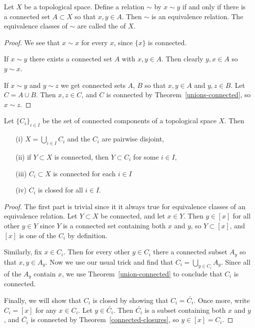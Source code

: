 \begin{prop}
  Let $X$ be a topological space. Define a relation $\sim$ by $x \sim y$ if and only if there is a connected set $A \subset X$ so that $x,y \in A$. Then $\sim$ is an equivalence relation. The equivalence classes of $\sim$ are called the  of $X$.
\end{prop}
\begin{proof}
  We see that $x \sim x$ for every $x$, since $\{x\}$ is connected.
  
  If $x \sim y$ there exists a connected set $A$ with $x,y \in A$. Then clearly $y,x \in A$ so $y \sim x$.
  
  If $x \sim y$ and $y \sim z$ we get connected sets $A$, $B$ so that $x,y \in A$ and $y,z \in B$. Let $C = A \cup B$. Then $x,z \in C$, and $C$ is connected by Theorem~\ref{unions-connected}, so $x \sim z$.
\end{proof}
\begin{prop}
  \label{props-of-conn-components}
  Let $\{C_i\}_{i \in I}$ be the set of connected components of a topological space $X$. Then
  \begin{itemize}
    \item[(i)] $X = \bigcup_{i \in I} C_i$ and the $C_i$ are pairwise disjoint,
    \item[(ii)] if $Y \subset X$ is connected, then $Y \subset C_i$ for some $i \in I$,
    \item[(iii)] $C_i \subset X$ is connected for each $i \in I$
    \item[(iv)] $C_i$ is closed for all $i \in I$.
  \end{itemize}
\end{prop}
\begin{proof}
  The first part is trivial since it it always true for equivalence classes of an equivalence relation. Let $Y \subset X$ be connected, and let $x \in Y$. Then $y \in [x]$ for all other $y \in Y$ since $Y$ is a connected set containing both $x$ and $y$, so $Y \subset [x]$, and $[x]$ is one of the $C_i$ by definition.
  
  Similarly, fix $x \in C_i$. Then for every other $y \in C_i$ there a connected subset $A_y$ so that $x, y \in A_y$. Now we use our usual trick and find that $C_i = \bigcup_{y \in C_i} A_y$. Since all of the $A_y$ contain $x$, we use Theorem~\ref{union-connected} to conclude that $C_i$ is connected.
  
  Finally, we will show that $C_i$ is closed by showing that $C_i = \bar{C_i}$. Once more, write $C_i = [x]$ for any $x \in C_i$. Let $y \in \bar{C_i}$. Then $\bar{C_i}$ is a subset containing both $x$ and $y$, and $\bar{C_i}$ is connected by Theorem~\ref{connected-closures}, so $y \in [x] = C_i$.
\end{proof}
